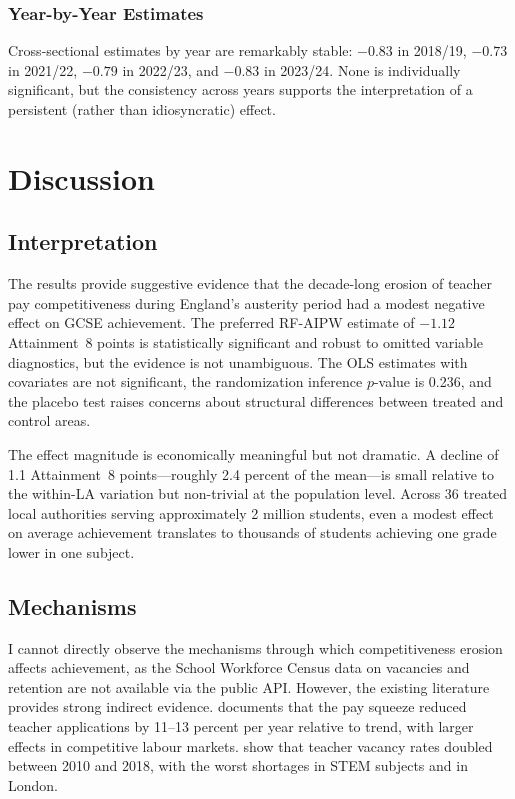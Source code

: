 \documentclass[12pt]{article}
\begin{document}
\subsubsection{Year-by-Year Estimates}

Cross-sectional estimates by year are remarkably stable: $-0.83$ in 2018/19, $-0.73$ in 2021/22, $-0.79$ in 2022/23, and $-0.83$ in 2023/24. None is individually significant, but the consistency across years supports the interpretation of a persistent (rather than idiosyncratic) effect.

\section{Discussion}\label{sec:discussion}

\subsection{Interpretation}

The results provide suggestive evidence that the decade-long erosion of teacher pay competitiveness during England's austerity period had a modest negative effect on GCSE achievement. The preferred RF-AIPW estimate of $-1.12$ Attainment~8 points is statistically significant and robust to omitted variable diagnostics, but the evidence is not unambiguous. The OLS estimates with covariates are not significant, the randomization inference $p$-value is 0.236, and the placebo test raises concerns about structural differences between treated and control areas.

The effect magnitude is economically meaningful but not dramatic. A decline of 1.1 Attainment~8 points---roughly 2.4 percent of the mean---is small relative to the within-LA variation but non-trivial at the population level. Across 36 treated local authorities serving approximately 2 million students, even a modest effect on average achievement translates to thousands of students achieving one grade lower in one subject.

\subsection{Mechanisms}

I cannot directly observe the mechanisms through which competitiveness erosion affects achievement, as the School Workforce Census data on vacancies and retention are not available via the public API. However, the existing literature provides strong indirect evidence. \citet{sims2020teacher} documents that the pay squeeze reduced teacher applications by 11--13 percent per year relative to trend, with larger effects in competitive labour markets. \citet{allen2018teacher} show that teacher vacancy rates doubled between 2010 and 2018, with the worst shortages in STEM subjects and in London.
\end{document}
